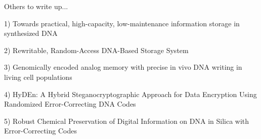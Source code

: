 \documentclass[USenglish,oneside,twocolumn]{article}
\begin{document}
Others to write up...

1) Towards practical, high-capacity, low-maintenance
information storage in synthesized DNA

2) Rewritable, Random-Access DNA-Based Storage System

3) Genomically encoded analog memory with precise in vivo DNA writing in living cell populations

4) HyDEn: A Hybrid Steganocryptographic Approach for Data Encryption Using Randomized Error-Correcting DNA Codes

5) Robust Chemical Preservation of Digital Information on DNA in Silica with Error-Correcting Codes


\begin{table}[!t]
    \centering
    \caption{Comparative evaluation of encoding schemes}
    \label{tbl:related_work}
\end{table}
\end{document}
